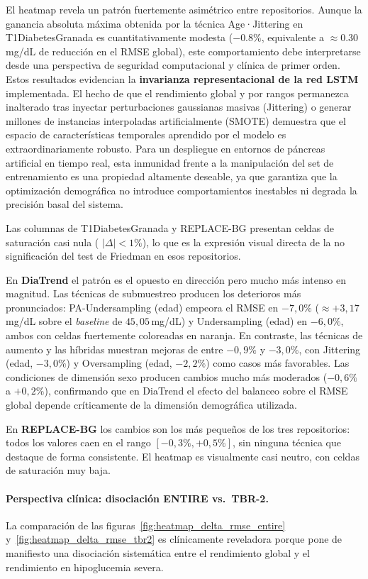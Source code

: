 El heatmap revela un patrón fuertemente asimétrico entre repositorios.
Aunque la ganancia absoluta máxima obtenida por la técnica Age·Jittering en T1DiabetesGranada es cuantitativamente modesta ($-0.8\%$, equivalente a $\approx 0.30$ mg/dL de reducción en el RMSE global), este comportamiento debe interpretarse desde una perspectiva de seguridad computacional y clínica de primer orden. Estos resultados evidencian la \textbf{invarianza representacional de la red LSTM} implementada. El hecho de que el rendimiento global y por rangos permanezca inalterado tras inyectar perturbaciones gaussianas masivas (Jittering) o generar millones de instancias interpoladas artificialmente (SMOTE) demuestra que el espacio de características temporales aprendido por el modelo es extraordinariamente robusto. Para un despliegue en entornos de páncreas artificial en tiempo real, esta inmunidad frente a la manipulación del set de entrenamiento es una propiedad altamente deseable, ya que garantiza que la optimización demográfica no introduce comportamientos inestables ni degrada la precisión basal del sistema.

Las columnas de T1DiabetesGranada y REPLACE-BG presentan celdas de saturación casi nula (
$|\Delta| < 1\%$), lo que es la expresión visual directa de la no significación del test de Friedman en esos repositorios.

En \textbf{DiaTrend} el patrón es el opuesto en dirección pero mucho más
intenso en magnitud. Las técnicas de submuestreo producen los deterioros más
pronunciados: PA-Undersampling (edad) empeora el RMSE en $-7{,}0\%$
($\approx +3{,}17$\,mg/dL sobre el \textit{baseline} de $45{,}05$\,mg/dL)
y Undersampling (edad) en $-6{,}0\%$, ambos con celdas fuertemente coloreadas
en naranja. En contraste, las técnicas de aumento y las híbridas muestran
mejoras de entre $-0{,}9\%$ y $-3{,}0\%$, con Jittering (edad, $-3{,}0\%$)
y Oversampling (edad, $-2{,}2\%$) como casos más favorables. Las condiciones
de dimensión sexo producen cambios mucho más moderados ($-0{,}6\%$ a
$+0{,}2\%$), confirmando que en DiaTrend el efecto del balanceo sobre el
RMSE global depende críticamente de la dimensión demográfica utilizada.

En \textbf{REPLACE-BG} los cambios son los más pequeños de los tres
repositorios: todos los valores caen en el rango $[-0{,}3\%, +0{,}5\%]$,
sin ninguna técnica que destaque de forma consistente. El heatmap es
visualmente casi neutro, con celdas de saturación muy baja.

\paragraph{Perspectiva clínica: disociación ENTIRE vs.\ TBR-2.}
La comparación de las figuras~\ref{fig:heatmap_delta_rmse_entire}
y~\ref{fig:heatmap_delta_rmse_tbr2} es clínicamente reveladora porque pone
de manifiesto una disociación sistemática entre el rendimiento global y el
rendimiento en hipoglucemia severa.

